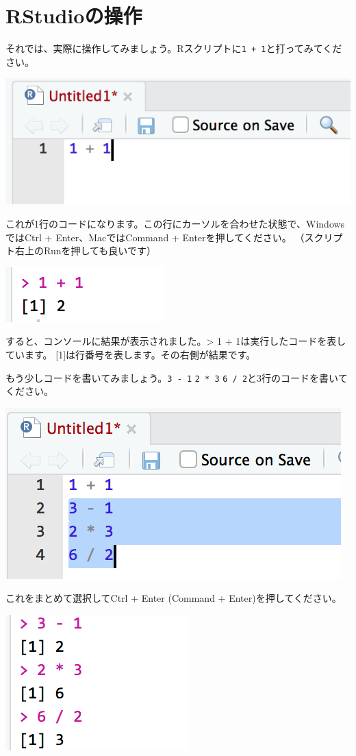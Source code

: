\documentclass[]{book}
\begin{document}
\section{RStudioの操作}\label{rstudioux306eux64cdux4f5c}

それでは、実際に操作してみましょう。Rスクリプトに\texttt{1\ +\ 1}と打ってみてください。

\begin{center}\includegraphics[width=0.4\linewidth]{image/basic1} \end{center}

これが1行のコードになります。この行にカーソルを合わせた状態で、WindowsではCtrl
+ Enter、MacではCommand + Enterを押してください。
（スクリプト右上のRunを押しても良いです）

\begin{center}\includegraphics[width=0.2\linewidth]{image/basic2} \end{center}

すると、コンソールに結果が表示されました。\textgreater{} 1 +
1は実行したコードを表しています。
{[}1{]}は行番号を表します。その右側が結果です。

もう少しコードを書いてみましょう。\texttt{3\ -\ 1} \texttt{2\ *\ 3}
\texttt{6\ /\ 2}と3行のコードを書いてください。

\begin{center}\includegraphics[width=0.4\linewidth]{image/basic3} \end{center}

これをまとめて選択してCtrl + Enter (Command + Enter)を押してください。

\begin{center}\includegraphics[width=0.2\linewidth]{image/basic4} \end{center}
\end{document}
